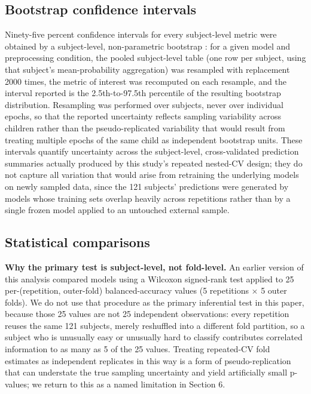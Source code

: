 \documentclass[a4paper,fleqn]{cas-sc}
\begin{document}
\subsection{Bootstrap confidence intervals}

Ninety-five percent confidence intervals for every subject-level metric were obtained by a subject-level, non-parametric bootstrap \cite{efron1979bootstrap}: for a given model and preprocessing condition, the pooled subject-level table (one row per subject, using that subject's mean-probability aggregation) was resampled with replacement 2000 times, the metric of interest was recomputed on each resample, and the interval reported is the 2.5th-to-97.5th percentile of the resulting bootstrap distribution. Resampling was performed over subjects, never over individual epochs, so that the reported uncertainty reflects sampling variability across children rather than the pseudo-replicated variability that would result from treating multiple epochs of the same child as independent bootstrap units. These intervals quantify uncertainty across the subject-level, cross-validated prediction summaries actually produced by this study's repeated nested-CV design; they do not capture all variation that would arise from retraining the underlying models on newly sampled data, since the 121 subjects' predictions were generated by models whose training sets overlap heavily across repetitions rather than by a single frozen model applied to an untouched external sample.



\subsection{Statistical comparisons}

\textbf{Why the primary test is subject-level, not fold-level.} An earlier version of this analysis compared models using a Wilcoxon signed-rank test applied to 25 per-(repetition, outer-fold) balanced-accuracy values (5 repetitions $\times$ 5 outer folds). We do not use that procedure as the primary inferential test in this paper, because those 25 values are not 25 independent observations: every repetition reuses the same 121 subjects, merely reshuffled into a different fold partition, so a subject who is unusually easy or unusually hard to classify contributes correlated information to as many as 5 of the 25 values. Treating repeated-CV fold estimates as independent replicates in this way is a form of pseudo-replication that can understate the true sampling uncertainty and yield artificially small p-values; we return to this as a named limitation in Section 6.
\end{document}
